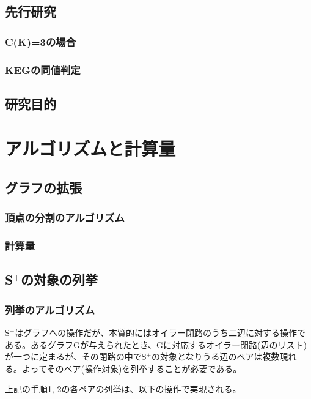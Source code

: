 \documentclass[11pt,a4j,draft]{jsreport}
\newcommand{\splus}{S${}^\text{+}$}
\newcommand{\riplus}{RI${}^\text{+}$}
\begin{document}
\section{先行研究}
\subsection{C(K)=3の場合}
\subsection{KEGの同値判定}

\section{研究目的}

\chapter{アルゴリズムと計算量}

\section{グラフの拡張}
\subsection{頂点の分割のアルゴリズム}
\subsection{}
\subsection{計算量}

\section{\splus の対象の列挙}
\subsection{列挙のアルゴリズム}
\splus はグラフへの操作だが、本質的にはオイラー閉路のうち二辺に対する操作である。あるグラフGが与えられたとき、Gに対応するオイラー閉路(辺のリスト)が一つに定まるが、その閉路の中で\splus の対象となりうる辺のペアは複数現れる。よってそのペア(操作対象)を列挙することが必要である。

上記の手順1, 2の各ペアの列挙は、以下の操作で実現される。
\end{document}
